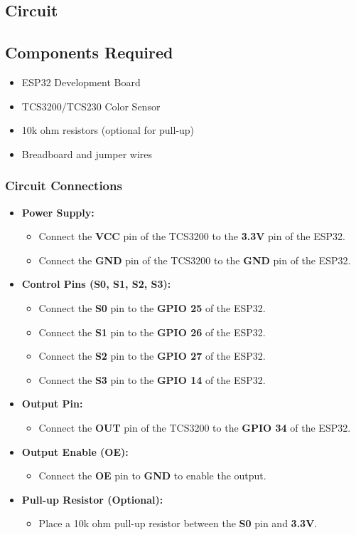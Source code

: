 \subsection*{Circuit}

\subsection*{Components Required}
\begin{itemize}
	\item ESP32 Development Board
	\item TCS3200/TCS230 Color Sensor
	\item 10k ohm resistors (optional for pull-up)
	\item Breadboard and jumper wires
\end{itemize}

\subsubsection*{Circuit Connections}
\begin{itemize}
	\item \textbf{Power Supply:}
	\begin{itemize}
		\item Connect the \textbf{VCC} pin of the TCS3200 to the \textbf{3.3V} pin of the ESP32.
		\item Connect the \textbf{GND} pin of the TCS3200 to the \textbf{GND} pin of the ESP32.
	\end{itemize}
	\item \textbf{Control Pins (S0, S1, S2, S3):}
	\begin{itemize}
		\item Connect the \textbf{S0} pin to the \textbf{GPIO 25} of the ESP32.
		\item Connect the \textbf{S1} pin to the \textbf{GPIO 26} of the ESP32.
		\item Connect the \textbf{S2} pin to the \textbf{GPIO 27} of the ESP32.
		\item Connect the \textbf{S3} pin to the \textbf{GPIO 14} of the ESP32.
	\end{itemize}
	\item \textbf{Output Pin:}
	\begin{itemize}
		\item Connect the \textbf{OUT} pin of the TCS3200 to the \textbf{GPIO 34} of the ESP32.
	\end{itemize}
	\item \textbf{Output Enable (OE):}
	\begin{itemize}
		\item Connect the \textbf{OE} pin to \textbf{GND} to enable the output.
	\end{itemize}
	\item \textbf{Pull-up Resistor (Optional):}
	\begin{itemize}
		\item Place a 10k ohm pull-up resistor between the \textbf{S0} pin and \textbf{3.3V}.
	\end{itemize}
\end{itemize}


